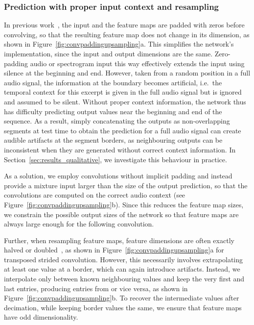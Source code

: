 \documentclass{article}
\begin{document}
\subsubsection{Prediction with proper input context and resampling}
\label{sec:model_improv_context}

In previous work~\cite{Jansson2017,Grais2018,Pascual2017}, the input and the feature maps are padded with zeros before convolving, so that the resulting feature map does not change in its dimension, as shown in Figure~\ref{fig:convpaddingupsampling}a.
This simplifies the network's implementation, since the input and output dimensions are the same.
Zero-padding audio or spectrogram input this way effectively extends the input using silence at the beginning and end.
However, taken from a random position in a full audio signal,
the information at the boundary becomes artificial, i.e.\ the temporal context for this excerpt is given in the full audio signal but is ignored and assumed to be silent.
Without proper context information, the network thus has difficulty predicting output values near the beginning and end of the sequence.
As a result, simply concatenating the outputs as non-overlapping segments at test time to obtain the prediction for a full audio signal can create audible artifacts at the segment borders, as neighbouring outputs can be inconsistent when they are generated without correct context information.
In Section~\ref{sec:results_qualitative}, we investigate this behaviour in practice.

As a solution, we employ convolutions without implicit padding and instead provide a mixture input larger than the size of the output prediction, so that the convolutions are computed on the correct audio context (see Figure~\ref{fig:convpaddingupsampling}b).
Since this reduces the feature map sizes, we constrain the possible output sizes of the network so that feature maps are always large enough for the following convolution.

Further, when resampling feature maps, feature dimensions are often exactly halved or doubled~\cite{Jansson2017,Pascual2017}, as shown in Figure~\ref{fig:convpaddingupsampling}a for transposed strided convolution.
However, this necessarily involves extrapolating at least one value at a border, which can again introduce artifacts.
Instead, we interpolate only between known neighbouring values and keep the very first and last entries, producing  entries from  or vice versa, as shown in Figure~\ref{fig:convpaddingupsampling}b.
To recover the intermediate values after decimation, while keeping border values the same, we ensure that feature maps have odd dimensionality.
\end{document}
